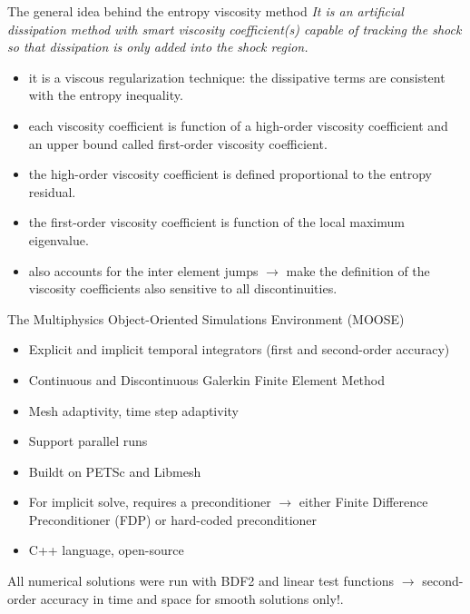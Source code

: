 \documentclass[xcolor=dvipsnames,10pt]{beamer}
\newcommand{\tcr}[1]{\textcolor{red}{#1}}
\begin{document}
\begin{frame}{The general idea behind the entropy viscosity method}
\emph{It is an artificial dissipation method with smart viscosity coefficient(s)  capable of tracking the shock so that dissipation is only added into the shock region.}
\begin{block}{}
\begin{itemize}
\setlength{\itemsep}{10pt}
\item it is a viscous regularization technique: the dissipative terms are consistent with the entropy inequality. 
\item each viscosity coefficient is function of a high-order viscosity coefficient and an upper bound called first-order viscosity coefficient.
\item the high-order viscosity coefficient is defined proportional to the entropy residual.
\item the first-order viscosity coefficient is function of the local maximum eigenvalue.
\item also accounts for the inter element jumps $\to$ make the definition of the viscosity coefficients also sensitive to all discontinuities. 
\end{itemize}
\end{block}
\end{frame}
\begin{frame}{The Multiphysics Object-Oriented Simulations Environment (MOOSE)}
\begin{block}{}
\begin{itemize}
\setlength{\itemsep}{10pt}
\item Explicit and implicit temporal integrators (first and second-order accuracy)
\item Continuous and Discontinuous Galerkin Finite Element Method
\item Mesh adaptivity, time step adaptivity
\item Support parallel runs
\item Buildt on PETSc and Libmesh
\item For implicit solve, requires a preconditioner $\to$ either Finite Difference Preconditioner (FDP) 
or hard-coded preconditioner
\item C++ language, open-source
\end{itemize}
\end{block}
\begin{block}{}
All numerical solutions were run with BDF2 and linear test functions $\to$ second-order accuracy in time and space for smooth solutions only!.
\end{block}
\end{frame}
\end{document}
